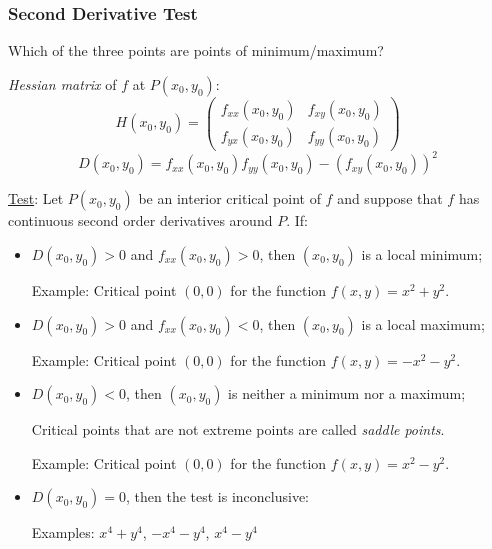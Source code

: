 \begin{frame}
  \frametitle{Second Derivative Test}

Which of the three points are points of minimum/maximum?\pause

\emph{Hessian matrix} of $f$ at $P(x_0,y_0)$:
%
$$H(x_0,y_0) = \left(\!
\begin{array}{cc}
  f_{xx}(x_0,y_0) & f_{xy}(x_0,y_0) \\
  f_{yx}(x_0,y_0) & f_{yy}(x_0,y_0)
\end{array}\!
 \right)\; $$
%
$$D(x_0,y_0) = f_{xx}(x_0,y_0) f_{yy}(x_0,y_0) - (f_{xy}(x_0,y_0))^2\; $$
%

\pause
\underline{Test}: Let $P(x_0,y_0)$ be an interior critical point of $f$ and suppose that $f$ has continuous second order derivatives around $P$. If:
%
\begin{itemize}
  \item \pause $D(x_0,y_0)>0$ and $f_{xx}(x_0,y_0)>0$, then $(x_0,y_0)$ is a local minimum;

      Example: Critical point $(0,0)$ for the function $f(x,y)=x^2+y^2$.

  \item \pause $D(x_0,y_0)>0$ and $f_{xx}(x_0,y_0)<0$, then $(x_0,y_0)$ is a local maximum;

      Example: Critical point $(0,0)$ for the function $f(x,y)=-x^2-y^2$.

  \item \pause $D(x_0,y_0)<0$, then $(x_0,y_0)$ is neither a minimum nor a maximum;

  Critical points that are not extreme points are called \emph{saddle points}.

        Example: Critical point $(0,0)$ for the function $f(x,y)=x^2-y^2$.

  \item \pause $D(x_0,y_0)=0$, then the test is inconclusive:

  Examples: $x^4+y^4$, $-x^4-y^4$, $x^4-y^4$

\end{itemize}
\end{frame}

